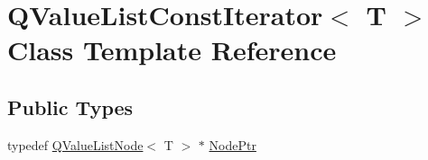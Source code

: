 \hypertarget{class_q_value_list_const_iterator}{}\section{Q\+Value\+List\+Const\+Iterator$<$ T $>$ Class Template Reference}
\label{class_q_value_list_const_iterator}
\subsection*{Public Types}
\begin{DoxyCompactItemize}
\item 
typedef \mbox{\hyperlink{class_q_value_list_node}{Q\+Value\+List\+Node}}$<$ T $>$ $\ast$ \mbox{\hyperlink{class_q_value_list_const_iterator_a2416aa81d7180a7e83fd7ddc334ec5d1}{Node\+Ptr}}
\end{DoxyCompactItemize}

